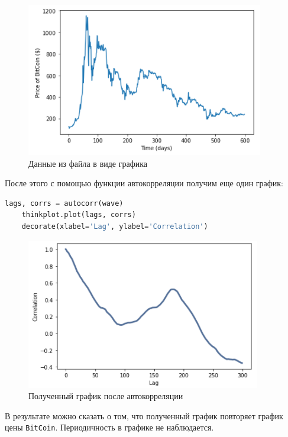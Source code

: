 \documentclass[a4paper]{article}
\begin{document}
            \begin{figure}[H]
                \centering
                \includegraphics{ex_3_wave_plot.png}
                \caption{Данные из файла в виде графика}
                \label{fig:ex_3_wave_plot}
            \end{figure}
            
            После этого с помощью функции автокорреляции получим еще один график:
            
\begin{lstlisting}[language=Python, caption= Получение нового графика после автокорреляции]
    lags, corrs = autocorr(wave)
    thinkplot.plot(lags, corrs)
    decorate(xlabel='Lag', ylabel='Correlation')
\end{lstlisting}               
            
            \begin{figure}[H]
                \centering
                \includegraphics{ex_3_autocorr.png}
                \caption{Полученный график после автокорреляции}
                \label{fig:ex_3_autocorr}
            \end{figure}
            
            В результате можно сказать о том, что полученный график повторяет график цены \texttt{BitCoin}. Периодичность в графике не наблюдается.
            
\end{document}

